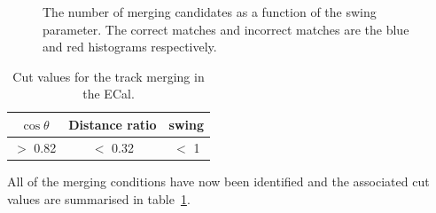 \begin{figure}
  \centering
  \caption{The number of merging candidates as a function of the swing parameter.  The correct matches and incorrect matches are the blue and red histograms respectively.}
  \label{fig:TrackMergingSwing}
\end{figure}
\begin{table}[b!]
  \begin{tabular}{ c c c }
    $\cos\theta$ & Distance ratio & swing \\ \hline \hline
    $>$ 0.82 & $<$ 0.32 & $<$ 1 \\
  \end{tabular}
  \caption{Cut values for the track merging in the ECal.}
  \label{table:TrackMergingParameters}
\end{table}
\newline
\newline
All of the merging conditions have now been identified and the associated cut values are summarised in table~\ref{table:TrackMergingParameters}.

